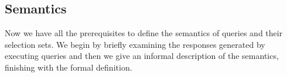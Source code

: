 








 
\subsection{Semantics}\label{subsec:semantics}
Now we have all the prerequisites to define the semantics of \gql queries and their selection sets. We begin by briefly examining the responses generated by executing queries and then we give an informal description of the semantics, finishing with the formal definition. %

